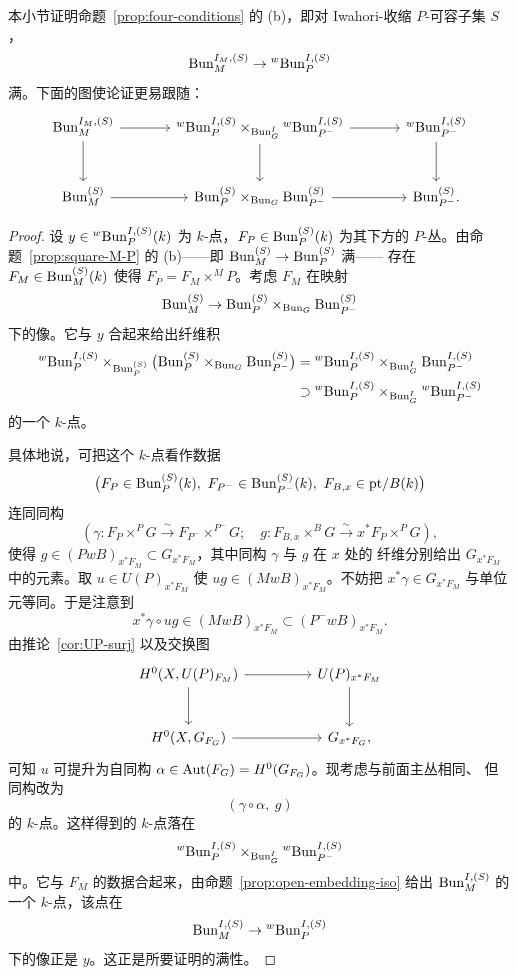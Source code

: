 本小节证明命题~\ref{prop:four-conditions} 的 (b)，即对 Iwahori-收缩 $P$-可容子集 $S$，
\[
\mathrm{Bun}^{I_M,(S)}_M\to {}^{w}\mathrm{Bun}^{I,(S)}_P
\]
满。下面的图使论证更易跟随：
\[
\begin{tikzcd}[column sep=large,row sep=large]
\Bun^{I_M,(S)}_M \arrow[r] \arrow[d] &
{}^{w}\Bun^{I,(S)}_P\times_{\Bun^I_G}{}^{w}\Bun^{I,(S)}_{P^-} \arrow[r] \arrow[d] &
{}^{w}\Bun^{I,(S)}_{P^-} \arrow[d]\\
\Bun^{(S)}_M \arrow[r] &
\Bun^{(S)}_P\times_{\Bun_G}\Bun^{(S)}_{P^-} \arrow[r] &
\Bun^{(S)}_{P^-}.
\end{tikzcd}
\]

\begin{proof}
设 $y\in {}^{w}\mathrm{Bun}^{I,(S)}_P(k)$ 为 $k$-点，$F_P\in \mathrm{Bun}^{(S)}_P(k)$ 为其下方的
$P$-丛。由命题~\ref{prop:square-M-P} 的 (b)——即 $\mathrm{Bun}^{(S)}_M\to \mathrm{Bun}^{(S)}_P$ 满——
存在 $F_M\in \mathrm{Bun}^{(S)}_M(k)$ 使得 $F_P=F_M\times^M P$。考虑 $F_M$ 在映射
\[
\mathrm{Bun}^{(S)}_M\to \mathrm{Bun}^{(S)}_P\times_{\mathrm{Bun}_G}\mathrm{Bun}^{(S)}_{P^-}
\]
下的像。它与 $y$ 合起来给出纤维积
\begin{align*}
{}^{w}\mathrm{Bun}^{I,(S)}_P\times_{\mathrm{Bun}^{(S)}_P}
\bigl(\mathrm{Bun}^{(S)}_P\times_{\mathrm{Bun}_G}\mathrm{Bun}^{(S)}_{P^-}\bigr)
&={}^{w}\mathrm{Bun}^{I,(S)}_P\times_{\mathrm{Bun}^I_G}\mathrm{Bun}^{I,(S)}_{P^-}\\
&\supset {}^{w}\mathrm{Bun}^{I,(S)}_P\times_{\mathrm{Bun}^I_G}{}^{w}\mathrm{Bun}^{I,(S)}_{P^-}
\end{align*}
的一个 $k$-点。

具体地说，可把这个 $k$-点看作数据
\[
\bigl(F_P\in \mathrm{Bun}^{(S)}_P(k),\ F_{P^-}\in \mathrm{Bun}^{(S)}_{P^-}(k),\ F_{B,x}\in \mathrm{pt}/B(k)\bigr)
\]
连同同构
\[
(\gamma\colon F_P\times^P G\xrightarrow{\sim}F_{P^-}\times^{P^-}G;\quad
g\colon F_{B,x}\times^B G\xrightarrow{\sim}x^*F_P\times^P G),
\]
使得 $g\in (PwB)_{x^*F_M}\subset G_{x^*F_M}$，其中同构 $\gamma$ 与 $g$ 在 $x$ 处的
纤维分别给出 $G_{x^*F_M}$ 中的元素。取
$u\in U(P)_{x^*F_M}$ 使 $ug\in (MwB)_{x^*F_M}$。不妨把
$x^*\gamma\in G_{x^*F_M}$ 与单位元等同。于是注意到
\[
x^*\gamma\circ ug\in (MwB)_{x^*F_M}\subset (P^-wB)_{x^*F_M}.
\]
由推论~\ref{cor:UP-surj} 以及交换图
\[
\begin{tikzcd}[column sep=huge,row sep=large]
H^0(X,U(P)_{F_M}) \arrow[r] \arrow[d] & U(P)_{x^*F_M} \arrow[d]\\
H^0(X,G_{F_G}) \arrow[r] & G_{x^*F_G},
\end{tikzcd}
\]
可知 $u$ 可提升为自同构 $\alpha\in \operatorname{Aut}(F_G)=H^0(G_{F_G})$。现考虑与前面主丛相同、
但同构改为
\[
(\gamma\circ \alpha,\ g)
\]
的 $k$-点。这样得到的 $k$-点落在
\[
{}^{w}\mathrm{Bun}^{I,(S)}_P\times_{\mathrm{Bun}^I_G}{}^{w}\mathrm{Bun}^{I,(S)}_{P^-}
\]
中。它与 $F_M$ 的数据合起来，由命题~\ref{prop:open-embedding-iso} 给出
$\mathrm{Bun}^{I,(S)}_M$ 的一个 $k$-点，该点在
\[
\mathrm{Bun}^{I,(S)}_M\to {}^{w}\mathrm{Bun}^{I,(S)}_P
\]
下的像正是 $y$。这正是所要证明的满性。
\end{proof}

